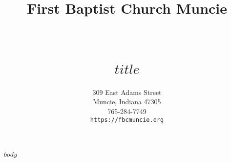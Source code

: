 \documentclass[paper=letter,fontsize=12pt,numbers=noenddot]{scrartcl}
\title{ \vspace{-1in} 	\usefont{OT1}{bch}{b}{n}
		\huge \strut First Baptist Church Muncie \strut \\
		\Large \bfseries \strut $title$ \strut
}
\author{ 									\usefont{OT1}{bch}{m}{n}
        309 East Adams Street\\		\usefont{OT1}{bch}{m}{n}
        Muncie, Indiana 47305\\	\usefont{OT1}{bch}{m}{n}
        765-284-7749\\
        \texttt{https://fbcmuncie.org}
}
\date{}
\begin{document}
\maketitle

$body$
\end{document}
